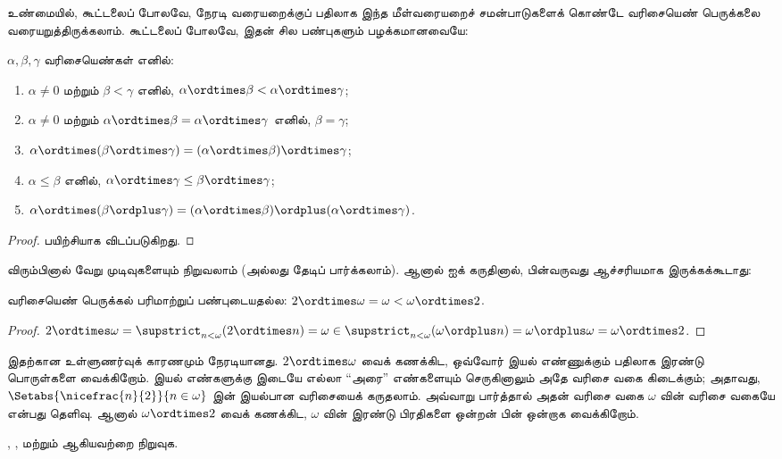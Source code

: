 \documentclass[../../../include/open-logic-section]{subfiles}
\begin{document}
உண்மையில், கூட்டலைப் போலவே, நேரடி வரையறைக்குப் பதிலாக இந்த
மீள்வரையறைச் சமன்பாடுகளைக் கொண்டே வரிசையெண் பெருக்கலை
வரையறுத்திருக்கலாம். கூட்டலைப் போலவே, இதன் சில பண்புகளும்
பழக்கமானவையே:

\begin{lem}
$\alpha, \beta, \gamma$ வரிசையெண்கள் எனில்:
\begin{enumerate}
  \item{} $\alpha \neq 0$ மற்றும்
  $\beta < \gamma$ எனில்,
  $\alpha \ordtimes \beta < \alpha \ordtimes \gamma$;
  \item{} $\alpha \neq 0$ மற்றும்
  $\alpha \ordtimes \beta = \alpha\ordtimes\gamma$ எனில்,
  $\beta = \gamma$;
  \item{}
  $\alpha \ordtimes (\beta \ordtimes \gamma) =
  (\alpha \ordtimes \beta) \ordtimes \gamma$;
  \item{} $\alpha \leq \beta$ எனில்,
  $\alpha \ordtimes \gamma \leq \beta \ordtimes \gamma$;
  \item{}
  $\alpha \ordtimes (\beta \ordplus \gamma) =
  (\alpha \ordtimes \beta )\ordplus (\alpha\ordtimes \gamma)$.
\end{enumerate}
\end{lem}

\begin{proof}
பயிற்சியாக விடப்படுகிறது.
\end{proof}

விரும்பினால் வேறு முடிவுகளையும் நிறுவலாம் (அல்லது தேடிப் பார்க்கலாம்).
ஆனால்  ஐக்
கருதினால், பின்வருவது ஆச்சரியமாக இருக்கக்கூடாது:

\begin{prop}
வரிசையெண் பெருக்கல் பரிமாற்றுப் பண்புடையதல்ல:
$2 \ordtimes \omega  = \omega < \omega \ordtimes 2$.
\end{prop}

\begin{proof}
$2 \ordtimes \omega = \supstrict_{n < \omega}(2\ordtimes  n)
= \omega \in \supstrict_{n < \omega}(\omega \ordplus n)
= \omega \ordplus \omega = \omega \ordtimes 2$.
\end{proof}
\noindent
இதற்கான உள்ளுணர்வுக் காரணமும் நேரடியானது. $2 \ordtimes \omega$
வைக் கணக்கிட, ஒவ்வோர் இயல் எண்ணுக்கும் பதிலாக இரண்டு பொருள்களை
வைக்கிறோம். இயல் எண்களுக்கு இடையே எல்லா ``அரை'' எண்களையும்
செருகினாலும் அதே வரிசை வகை கிடைக்கும்; அதாவது,
$\Setabs{\nicefrac{n}{2}}{n \in \omega}$ இன் இயல்பான வரிசையைக்
கருதலாம். அவ்வாறு பார்த்தால் அதன் வரிசை வகை $\omega$ வின்
வரிசை வகையே என்பது தெளிவு. ஆனால் $\omega \ordtimes 2$ வைக்
கணக்கிட, $\omega$ வின் இரண்டு பிரதிகளை ஒன்றன் பின் ஒன்றாக
வைக்கிறோம்.

\begin{prob}
,
,
மற்றும்
ஆகியவற்றை நிறுவுக.
\end{prob}
\end{document}
